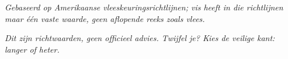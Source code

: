 \vspace{0.2em}
{\footnotesize\itshape\color{inkfaint}Gebaseerd op Amerikaanse
vleeskeuringsrichtlijnen\cite{usda-fsis-appendixa,fda-foodcode}; vis heeft
in die richtlijnen maar één vaste waarde, geen aflopende reeks zoals
vlees.\par}

\vspace{0.6em}
{\footnotesize\itshape\color{inkfaint}Dit zijn richtwaarden, geen officieel
advies. Twijfel je? Kies de veilige kant: langer of heter.\par}
